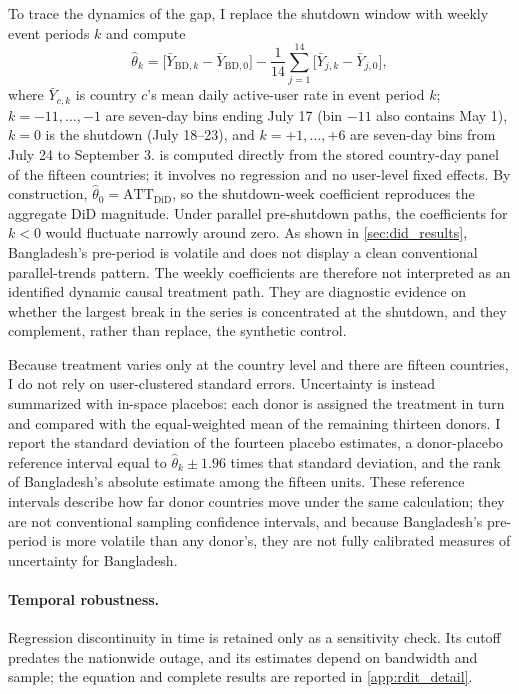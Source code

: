To trace the dynamics of the gap, I replace the shutdown window with weekly event periods $k$ and compute
\begin{equation}
  \hat\theta_{k} = \bigl[\bar{Y}_{\mathrm{BD},k} - \bar{Y}_{\mathrm{BD},0}\bigr]
  - \frac{1}{14}\sum_{j=1}^{14}\bigl[\bar{Y}_{j,k} - \bar{Y}_{j,0}\bigr],
  \label{eq:es_agg}
\end{equation}
where $\bar{Y}_{c,k}$ is country $c$'s mean daily active-user rate in event period $k$; $k=-11,\dots,-1$ are seven-day bins ending July 17 (bin $-11$ also contains May 1), $k=0$ is the shutdown (July 18--23), and $k=+1,\dots,+6$ are seven-day bins from July 24 to September 3.  is computed directly from the stored country-day panel of the fifteen countries; it involves no regression and no user-level fixed effects. By construction, $\hat\theta_0 = \mathrm{ATT}_{\mathrm{DiD}}$, so the shutdown-week coefficient reproduces the aggregate DiD magnitude. Under parallel pre-shutdown paths, the coefficients for $k<0$ would fluctuate narrowly around zero. As shown in \cref{sec:did_results}, Bangladesh's pre-period is volatile and does not display a clean conventional parallel-trends pattern. The weekly coefficients are therefore not interpreted as an identified dynamic causal treatment path. They are diagnostic evidence on whether the largest break in the series is concentrated at the shutdown, and they complement, rather than replace, the synthetic control.

Because treatment varies only at the country level and there are fifteen countries, I do not rely on user-clustered standard errors. Uncertainty is instead summarized with in-space placebos: each donor is assigned the treatment in turn and compared with the equal-weighted mean of the remaining thirteen donors. I report the standard deviation of the fourteen placebo estimates, a donor-placebo reference interval equal to $\hat\theta_k \pm 1.96$ times that standard deviation, and the rank of Bangladesh's absolute estimate among the fifteen units. These reference intervals describe how far donor countries move under the same calculation; they are not conventional sampling confidence intervals, and because Bangladesh's pre-period is more volatile than any donor's, they are not fully calibrated measures of uncertainty for Bangladesh.

\paragraph{Temporal robustness.} Regression discontinuity in time is retained only as a sensitivity check. Its cutoff predates the nationwide outage, and its estimates depend on bandwidth and sample; the equation and complete results are reported in \cref{app:rdit_detail}.

